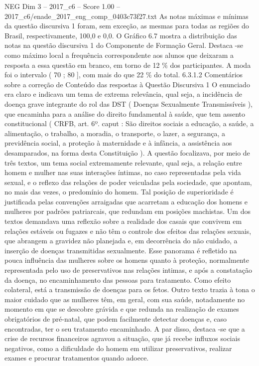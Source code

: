 \begin{textsample}{NEG Dim 3 – 2017\_c6 – Score 1.00 – 2017\_c6/enade\_2017\_eng\_comp\_0403c73f27.txt}
As notas máximas e mínimas da questão discursiva 1 foram, sem exceção, as mesmas para todas as regiões do Brasil, respectivamente, 100,0 e 0,0.
O Gráfico 6.7 mostra a distribuição das notas na questão discursiva 1 do Componente de Formação Geral.
Destaca -se como máximo local a frequência correspondente aos alunos que deixaram a resposta a essa questão em branco, em torno de 12 \% dos participantes.
A moda foi o intervalo ( 70 ; 80 ], com mais do que 22 \% do total. 6.3.1.2 Comentários sobre a correção de Conteúdo das respostas à Questão Discursiva 1 O enunciado era claro e indicava um tema de extrema relevância, qual seja, a incidência de doença grave integrante do rol das DST ( Doenças Sexualmente Transmissíveis ), que encaminha para a análise do direito fundamental à saúde, que tem assento constitucional ( CRFB, art. 6º. caput : São direitos sociais a educação, a saúde, a alimentação, o trabalho, a moradia, o transporte, o lazer, a segurança, a previdência social, a proteção à maternidade e à infância, a assistência aos desamparados, na forma desta Constituição ).
A questão focalizava, por meio de três textos, um tema social extremamente relevante, qual seja, a relação entre homem e mulher nas suas interações íntimas, no caso representadas pela vida sexual, e o reflexo das relações de poder veiculadas pela sociedade, que apontam, no mais das vezes, o predomínio do homem.
Tal posição de superioridade é justificada pelas convenções arraigadas que acarretam a educação dos homens e mulheres por padrões patriarcais, que redundam em posições machistas.
Um dos textos demandava uma reflexão sobre a realidade dos casais que convivem em relações estáveis ou fugazes e não têm o controle dos efeitos das relações sexuais, que abrangem a gravidez não planejada e, em decorrência do não cuidado, a inserção de doenças transmitidas sexualmente.
Esse panorama é refletido na pouca influência das mulheres sobre os homens quanto à proteção, normalmente representada pelo uso de preservativos nas relações intimas, e após a constatação da doença, no encaminhamento das pessoas para tratamento.
Como efeito colateral, está a transmissão de doenças para os fetos.
Outro texto trazia à tona o maior cuidado que as mulheres têm, em geral, com sua saúde, notadamente no momento em que se descobre grávida e que redunda na realização de exames obrigatórios de pré-natal, que podem facilmente detectar doenças e, caso encontradas, ter o seu tratamento encaminhado.
A par disso, destaca -se que a crise de recursos financeiros agravou a situação, que já recebe influxos sociais negativos, como a dificuldade do homem em utilizar preservativos, realizar exames e procurar tratamentos quando adoece.

\end{textsample}
